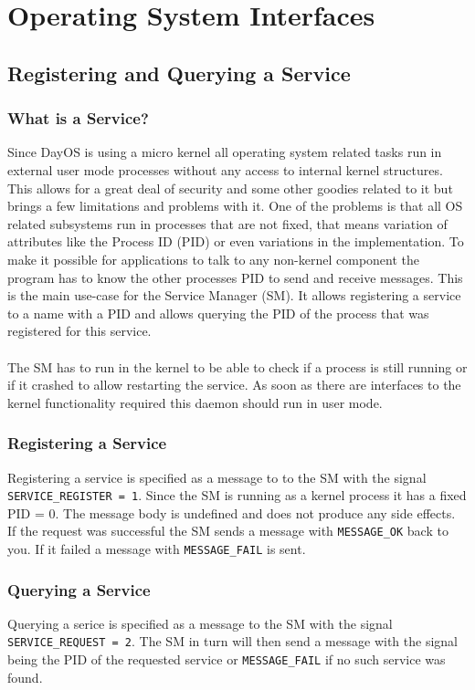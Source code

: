 \chapter{Operating System Interfaces}
\section{Registering and Querying a Service}
\subsection{What is a Service?}
Since DayOS is using a micro kernel all operating system related tasks run in external user mode processes without any access to internal kernel structures.
This allows for a great deal of security and some other goodies related to it but brings a few limitations and problems with it.
One of the problems is that all OS related subsystems run in processes that are not fixed, that means
variation of attributes like the Process ID (PID) or even variations in the implementation.
To make it possible for applications to talk to any non-kernel component the program has
to know the other processes PID to send and receive messages. This is the main use-case for the Service Manager (SM).
It allows registering a service to a name with a PID and allows querying the PID of the process
that was registered for this service. \\ \\
The SM has to run in the kernel to be able to check if a process is still running or if it crashed
to allow restarting the service. As soon as there are interfaces to the kernel functionality required this daemon should run
in user mode.
\subsection{Registering a Service}
Registering a service is specified as a message to to the SM with the signal \texttt{SERVICE\_REGISTER = 1}.
Since the SM is running as a kernel process it has a fixed PID = 0. The message body is undefined and does not
produce any side effects. If the request was successful the SM sends a message with \texttt{MESSAGE\_OK} back to you.
If it failed a message with \texttt{MESSAGE\_FAIL} is sent.

\subsection{Querying a Service}
Querying a serice is specified as a message to the SM with the signal \texttt{SERVICE\_REQUEST = 2}.
The SM in turn will then send a message with the signal being the PID of the requested service or \texttt{MESSAGE\_FAIL}
if no such service was found.

